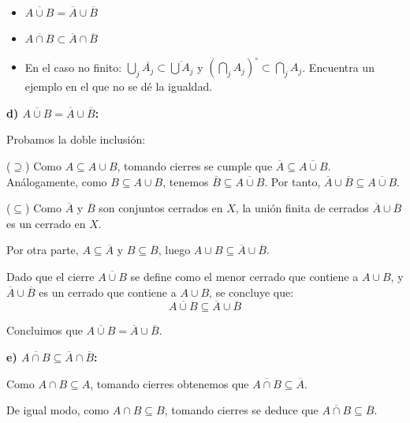 \begin{ejer}
    [38 d) e) f)] \,
    \begin{itemize}
        \item[d)] $\overline{A \cup B} = \overline{A} \cup \overline{B}$
        \item[e)] $\overline{A\cap B} \subset \overline{A} \cap \overline{B}$
        \item[f)] En el caso no finito: $\bigcup_j \overline{A_j} \subset \overline{\bigcup A_j}$ y $(\bigcap_j A_j)^{\circ} \subset \bigcap_j A_j$. Encuentra un ejemplo en el que no se dé la igualdad.
    \end{itemize}
\end{ejer}
\begin{sol}
    \textbf{d) $\overline{A \cup B} = \overline{A} \cup \overline{B}$:}

    Probamos la doble inclusión:

    ($\supseteq$) Como $A \subseteq A \cup B$, tomando cierres se cumple que $\overline{A} \subseteq \overline{A \cup B}$. Análogamente, como $B \subseteq A \cup B$, tenemos $\overline{B} \subseteq \overline{A \cup B}$. Por tanto, $\overline{A} \cup \overline{B} \subseteq \overline{A \cup B}$.

    ($\subseteq$) Como $\overline{A}$ y $\overline{B}$ son conjuntos cerrados en $X$, la unión finita de cerrados $\overline{A} \cup \overline{B}$ es un cerrado en $X$.
    
      Por otra parte, $A \subseteq \overline{A}$ y $B \subseteq \overline{B}$, luego $A \cup B \subseteq \overline{A} \cup \overline{B}$.
    
      Dado que el cierre $\overline{A \cup B}$ se define como el menor cerrado que contiene a $A \cup B$, y $\overline{A} \cup \overline{B}$ es un cerrado que contiene a $A \cup B$, se concluye que:
      \[
          \overline{A \cup B} \subseteq \overline{A} \cup \overline{B}
      \]

    Concluimos que $\overline{A \cup B} = \overline{A} \cup \overline{B}$.

    \medskip

    \textbf{e) $\overline{A \cap B} \subseteq \overline{A} \cap \overline{B}$:}

    Como $A \cap B \subseteq A$, tomando cierres obtenemos que $\overline{A \cap B} \subseteq \overline{A}$.
    
    De igual modo, como $A \cap B \subseteq B$, tomando cierres se deduce que $\overline{A \cap B} \subseteq \overline{B}$.
    

\end{sol}
